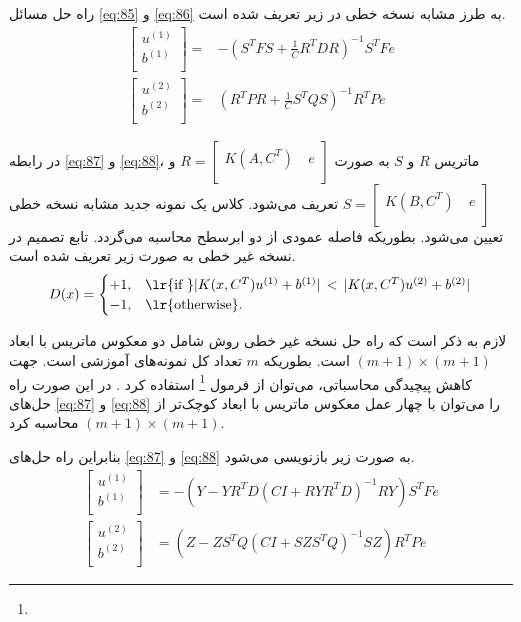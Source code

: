راه حل مسائل \ref{eq:85} و \ref{eq:86} به طرز مشابه نسخه خطی در زیر تعریف شده است.
\begin{align}
\left[\begin{matrix}
{{u}^{(1)}}  \\
{{b}^{(1)}}  \\
\end{matrix} \right]= & -{({{S}^{T}}FS+\frac{1}{C}{{R}^{T}}DR)^{-1}}{{S}^{T}}Fe \label{eq:87} \\
\left[ \begin{matrix}
{{u}^{(2)}}  \\
{{b}^{(2)}}  \\
\end{matrix} \right]= & {({{R}^{T}}PR+\frac{1}{C}{{S}^{T}}QS)^{-1}}{{R}^{T}}Pe \label{eq:88}
\end{align}

در رابطه \ref{eq:87} و \ref{eq:88}، ماتریس $R$ و $S$  به صورت  $R=\left[ \begin{matrix} K(A,{{C}^{T}})\ & e  \\ \end{matrix} \right]$ و   $S=\left[ \begin{matrix} K(B,{{C}^{T}})\ & e  \\ \end{matrix} \right]$ تعریف می‌شود. کلاس یک نمونه جدید مشابه نسخه خطی تعیین می‌شود. بطوریکه فاصله عمودی از دو ابرسطح محاسبه می‌گردد. تابع تصمیم در نسخه غیر خطی به صورت زیر تعریف شده است. 
\begin{equation}\label{eq:89}
D(x) =
\begin{cases}
+1, & \textrm{\lr{if }} |K(x,{C}^{T}){{u}^{(1)}}+{{b}^{(1)}}|\, < \, |K(x,{C}^{T}){{u}^{(2)}}+{{b}^{(2)}}|  \\
-1, & \textrm{\lr{otherwise}}.
\end{cases}
\end{equation}

لازم به ذکر است که راه حل نسخه غیر خطی روش  شامل دو معکوس ماتریس با ابعاد  $(m+1)\times (m+1)$ است. بطوریکه $m$  تعداد کل نمونه‌های آموزشی است. جهت کاهش پیچیدگی محاسباتی، می‌توان از فرمول \footnote{}  استفاده کرد \cite{golub2012}. در این صورت راه حل‌های \ref{eq:87} و \ref{eq:88} را می‌توان با چهار عمل معکوس ماتریس با ابعاد کوچک‌تر از $(m+1)\times (m+1)$ محاسبه کرد. 

بنابراین راه حل‌های \ref{eq:87} و \ref{eq:88} به صورت زیر بازنویسی می‌شود.
\begin{align}
\left[ \begin{matrix}
{{u}^{(1)}}  \\
{{b}^{(1)}}  \\
\end{matrix} \right]& = -(Y-Y{{R}^{T}}D{{(CI+RY{{R}^{T}}D)}^{-1}}RY){{S}^{T}}Fe \label{eq:90} \\
\left[ \begin{matrix}
{{u}^{(2)}}  \\
{{b}^{(2)}}  \\
\end{matrix} \right] & = (Z-Z{{S}^{T}}Q{{(CI+SZ{{S}^{T}}Q)}^{-1}}SZ){{R}^{T}}Pe \label{eq:91}
\end{align}


